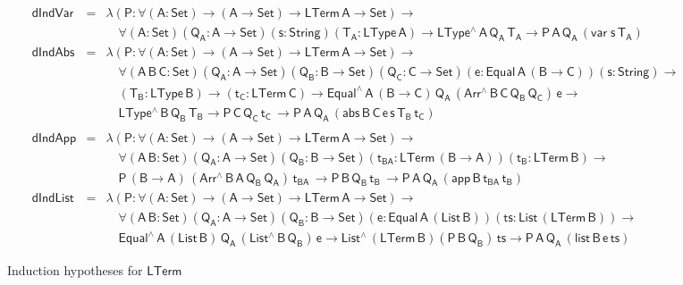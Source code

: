 \documentclass[sigplan,10pt]{acmart}
\begin{document}
\begin{figure*}[t]

\begin{adjustbox}{varwidth=7.3in, max width=7.1in, margin=-0.0in 0in
      -0.2in 0in, fbox, center} 

{\small
\[\begin{array}{lll}
\mathsf{dIndVar} & = & \mathsf{\lambda (P : \forall (A : Set) \to (A \to Set) \to
  LTerm\,A  \to Set) \to}\\
& &   \quad\mathsf{\forall (A : Set) (Q_A : A \to Set) (s : String) (T_A :
  LType\, A) \to LType^{\wedge} \, A\, Q_A\, T_A \to P \, A\, Q_A\,
 (var \; s\, T_A)}\\[1ex]
\mathsf{dIndAbs} & = & \mathsf{\lambda (P : \forall (A : Set) \to (A \to Set) \to
  LTerm\,A \to Set) \to} \\ 
& &   \quad\mathsf{
  \forall (A\,B\,C: Set) (Q_A : A \to Set)  (Q_B : B \to Set) (Q_C : C
  \to Set) (e : Equal\, A\, (B \to C)) (s : String) \to } \\ 
& &   \quad\mathsf{(T_B : LType\, B) \to (t_C : LTerm\, C)
  \to Equal^{\wedge}\,A\,(B \to C)\, Q_A \, (Arr^{\wedge} \, B\, C\,
  Q_B \, Q_C) \, e \to  } \\
& &   \quad\mathsf{
  LType^{\wedge}\, B\, Q_B\, T_B
  \to P\, C\, Q_C\, t_C\, 
  \to P \, A\, Q_A\, (abs \,B \,C \, e \,s \,T_B \, t_C)}\\
 \\
\mathsf{dIndApp} & = &  \mathsf{\lambda (P : \forall (A : Set) \to (A \to Set) \to LTerm\,A
    \to Set)\to} \\ 
& &  \quad \mathsf{
  \forall (A \,B : Set) (Q_A : A \to Set)  (Q_B : B \to Set) 
   (t_{BA} : LTerm\, (B \to A)) (t_B : LTerm\, B) \to} \\
& &   \quad \mathsf{
  P\, (B \to A)\, (Arr^{\wedge} \, B\, A\, Q_B \, Q_A) \, t_{BA} \, 
  \to P\, B\, Q_B\, t_B\, 
  \to P \, A\, Q_A\, (app \,B \,t_{BA} \, t_B) }\\[1ex]
\mathsf{dIndList} & = &   \mathsf{\lambda (P : \forall (A : Set) \to (A \to Set) \to LTerm\,A
    \to Set) \to} \\ 
& &   \quad \mathsf{
  \forall (A \,B : Set) (Q_A : A \to Set)  (Q_B : B \to Set) 
    (e : Equal\, A\, (List\, B)) (ts : List\, (LTerm\, B)) \to} \\ 
& &   \quad \mathsf{
    Equal^{\wedge}\, A\, (List\,B)\, Q_A\, (List^{\wedge}\, B\, Q_B)\, e 
  \to List^{\wedge}\, (LTerm\,B) (P\, B\, Q_B)\, ts
  \to P \, A\, Q_A\, (list \,B \,e \, ts) }
\end{array}\]}

\vspace*{-0.1in}

\caption{Induction hypotheses for $\mathsf{LTerm}$}\label{fig:ind-hyps-lterm}
\end{adjustbox}
\end{figure*}
\end{document}
